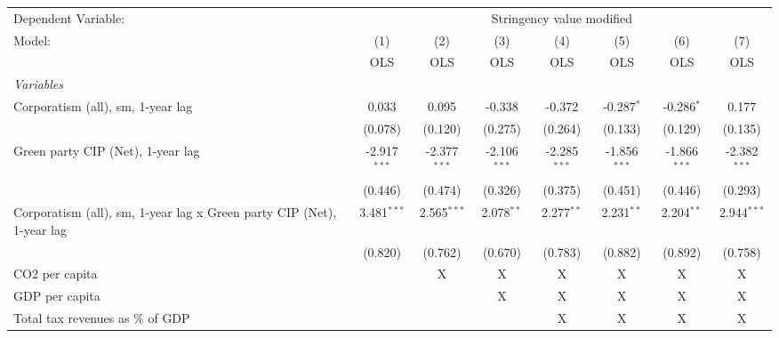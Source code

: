 
\begingroup
\centering
\begin{tabular}{lccccccc}
   \toprule
   Dependent Variable: & \multicolumn{7}{c}{Stringency value modified}\\
   Model:                                                                & (1)            & (2)            & (3)            & (4)            & (5)            & (6)            & (7)\\  
                                                                         &  OLS           & OLS            & OLS            & OLS            & OLS            & OLS            & OLS\\  
   \midrule
   \emph{Variables}\\
   Corporatism (all), sm, 1-year lag                                     & 0.033          & 0.095          & -0.338         & -0.372         & -0.287$^{*}$   & -0.286$^{*}$   & 0.177\\   
                                                                         & (0.078)        & (0.120)        & (0.275)        & (0.264)        & (0.133)        & (0.129)        & (0.135)\\   
   Green party CIP (Net), 1-year lag                                     & -2.917$^{***}$ & -2.377$^{***}$ & -2.106$^{***}$ & -2.285$^{***}$ & -1.856$^{***}$ & -1.866$^{***}$ & -2.382$^{***}$\\   
                                                                         & (0.446)        & (0.474)        & (0.326)        & (0.375)        & (0.451)        & (0.446)        & (0.293)\\   
   Corporatism (all), sm, 1-year lag x Green party CIP (Net), 1-year lag & 3.481$^{***}$  & 2.565$^{***}$  & 2.078$^{**}$   & 2.277$^{**}$   & 2.231$^{**}$   & 2.204$^{**}$   & 2.944$^{***}$\\   
                                                                         & (0.820)        & (0.762)        & (0.670)        & (0.783)        & (0.882)        & (0.892)        & (0.758)\\   
   CO2 per capita                                                        &                & X              & X              & X              & X              & X              & X\\  
   GDP per capita                                                        &                &                & X              & X              & X              & X              & X\\  
   Total tax revenues as \% of GDP                                       &                &                &                & X              & X              & X              & X\\  

\end{tabular}
